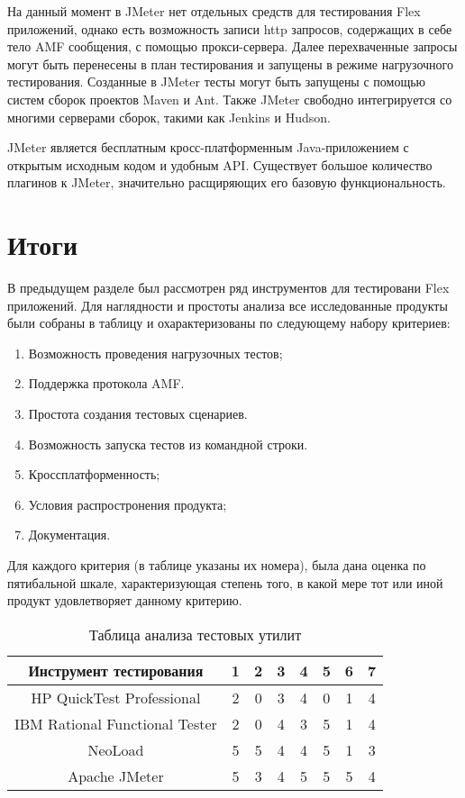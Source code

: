 На данный момент в JMeter нет отдельных средств для тестирования Flex приложений, 
однако есть возможность записи http запросов, содержащих в себе тело AMF 
сообщения, с помощью прокси-сервера. Далее перехваченные запросы могут быть 
перенесены в план тестирования и запущены в режиме нагрузочного тестирования. 
Созданные в JMeter тесты могут быть запущены с помощью систем сборок проектов Maven и 
Ant. Также JMeter свободно интегрируется со многими серверами сборок, такими как Jenkins 
и Hudson.

JMeter является бесплатным кросс-платформенным Java-приложением с открытым
исходным кодом и удобным API. Существует большое количество плагинов к JMeter, 
значительно расщиряющих его базовую функциональность.

\section{Итоги}

В предыдущем разделе был рассмотрен ряд инструментов для тестировани Flex приложений.
Для наглядности и простоты анализа все исследованные продукты были собраны в таблицу и 
охарактеризованы по следующему набору критериев:

\begin{enumerate}
\item Возможность проведения нагрузочных тестов; 
\item Поддержка протокола AMF.
\item Простота создания тестовых сценариев.
\item Возможность запуска тестов из командной строки.
\item Кроссплатформенность;
\item Условия распростронения продукта;
\item Документация.
\end{enumerate}

Для каждого критерия (в таблице указаны их номера), была дана оценка по пятибальной шкале, 
характеризующая степень того, в какой мере тот или иной продукт удовлетворяет данному критерию.

\begin{table}[ht]
\caption{Таблица анализа тестовых утилит}
\begin{tabular}{|c|c|c|c|c|c|c|c|}
\hline 
Инструмент тестирования & 1 & 2 & 3 & 4 & 5 & 6 & 7\\
\hline 
HP QuickTest Professional & 2 & 0 & 3 & 4 & 0 & 1 & 4\\
\hline 
IBM Rational Functional Tester & 2 & 0 & 4 & 3 & 5 & 1 & 4\\
\hline 
NeoLoad & 5 & 5 & 4 & 4 & 5 & 1 & 3\\
\hline 
Apache JMeter & 5 & 3 & 4 & 5 & 5 & 5 & 4\\
\hline 
\end{tabular} 
\label{tab:tabular}
\end{table}


